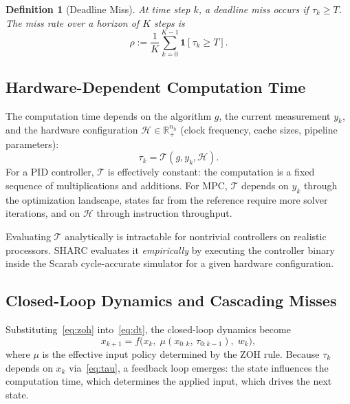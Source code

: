 \documentclass[conference]{IEEEtran}
\newcommand{\R}{\mathbb{R}}
\newcommand{\calH}{\mathcal{H}}
\newcommand{\calT}{\mathcal{T}}
\newtheorem{definition}{Definition}
\begin{document}
\begin{definition}[Deadline Miss]\label{def:miss}
  At time step $k$, a \emph{deadline miss} occurs if $\tau_k \geq T$.
  The \emph{miss rate} over a horizon of $K$ steps is
  $$\rho := \frac{1}{K}\sum_{k=0}^{K-1}\mathbf{1}[\tau_k \geq T].$$
\end{definition}

\subsection{Hardware-Dependent Computation
  Time}\label{sec:tau_model}

The computation time depends on the algorithm $g$, the current
measurement $y_k$, and the hardware configuration
$\calH \in \R_+^{n_h}$ (clock frequency, cache sizes, pipeline
parameters):
\begin{equation}\label{eq:tau}
  \tau_k = \calT(g, y_k, \calH).
\end{equation}
For a PID controller, $\calT$ is effectively constant: the
computation is a fixed sequence of multiplications and additions.
For MPC, $\calT$ depends on $y_k$ through the optimization
landscape, states far from the reference require more solver
iterations, and on $\calH$ through instruction throughput.

Evaluating $\calT$ analytically is intractable for nontrivial
controllers on realistic processors.  SHARC evaluates it
\emph{empirically} by executing the controller binary inside the
Scarab cycle-accurate simulator for a given hardware configuration.

\subsection{Closed-Loop Dynamics and Cascading Misses}

Substituting~\eqref{eq:zoh} into~\eqref{eq:dt}, the closed-loop
dynamics become
\begin{equation}\label{eq:cl}
  x_{k+1} = f\!\bigl(x_k,\; \mu(x_{0:k},\, \tau_{0:k-1}),\;
  w_k\bigr),
\end{equation}
where $\mu$ is the effective input policy determined by the
ZOH rule.  Because $\tau_k$ depends on $x_k$
via~\eqref{eq:tau}, a feedback loop emerges: the state influences
the computation time, which determines the applied input, which
drives the next state.
\end{document}
